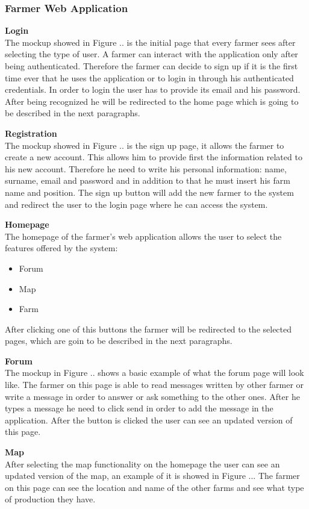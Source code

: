 \subsubsection{Farmer Web Application}
\textbf{Login}\\ 
The mockup showed in Figure .. is the initial page that every farmer sees after selecting the type of user. A farmer can interact with the application only 
after being authenticated. Therefore the farmer can decide to sign up if it is the first time ever that he uses the application or to login in through his authenticated credentials.
In order to login the user has to provide its email and his password. After being recognized he will be redirected to the home page which is going to be described in the next paragraphs.

\textbf{Registration} \\
The mockup showed in Figure .. is the sign up page, it allows the farmer to create a new account. This allows him to provide first the information related to his new account. 
Therefore he need to write his personal information: name, surname, email and password and in addition to that he must insert his farm name and position.
The sign up button will add the new farmer to the system and redirect the user to the login page where he can access the system.

\textbf{Homepage}\\
The homepage of the farmer's web application allows the user to select the features offered by the system:
\begin{itemize}
    \item Forum
    \item Map
    \item Farm
\end{itemize}
After clicking one of this buttons the farmer will be redirected to the selected pages, which are goin to be described in the next paragraphs.

\textbf{Forum}\\
The mockup in Figure .. shows a basic example of what the forum page will look like. The farmer on this page is able to read messages written by other farmer or 
write a message in order to answer or ask something to the other ones. After he types a message he need to click send in order to add the message in the application. 
After the button is clicked the user can see an updated version of this page.

\textbf{Map}\\
After selecting the map functionality on the homepage the user can see an updated version of the map, 
an example of it is showed in Figure ... The farmer on this page can see the location and name of the other farms and see what type of production 
they have.


